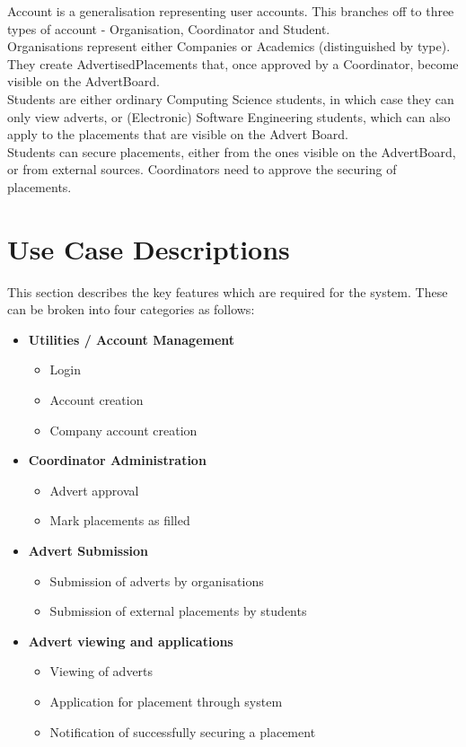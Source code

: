 \documentclass{l3deliverable}
\begin{document}
Account is a generalisation representing user accounts. This branches off to three types of account - Organisation, Coordinator and Student.\\

Organisations represent either Companies or Academics (distinguished by type). They create AdvertisedPlacements that, once approved by a Coordinator, become visible on the AdvertBoard.\\

Students are either ordinary Computing Science students, in which case they can only view adverts, or (Electronic) Software Engineering students, which can also apply to the placements that are visible on the Advert Board.\\

Students can secure placements, either from the ones visible on the AdvertBoard, or from external sources. Coordinators need to approve the securing of placements.


\newpage
\section{Use Case Descriptions}
This section describes the key features which are required for the system. These can be broken into four categories as follows:\
\begin{itemize}
\item{\textbf{Utilities / Account Management}
	\begin{itemize}
		\item{Login}
		\item{Account creation}
		\item{Company account creation}
	\end{itemize}}
\item{\textbf{Coordinator Administration}
	\begin{itemize}
		\item{Advert approval}
		\item{Mark placements as filled}
	\end{itemize}}
\item{\textbf{Advert Submission}
	\begin{itemize}
		\item{Submission of adverts by organisations}
		\item{Submission of external placements by students}
	\end{itemize}}
\item{\textbf{Advert viewing and applications}
	\begin{itemize}
		\item{Viewing of adverts}
		\item{Application for placement through system}
		\item{Notification of successfully securing a placement}
	\end{itemize}}
\end{itemize}
\end{document}
